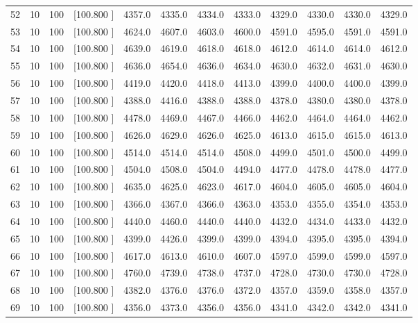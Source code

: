 \documentclass[12pt,a4paper]{article}
\begin{document}
\begin{center}
{\begin{tabular}{r r r r r r r r r r r r}
  52& 10&100&[100.800   ]&  4357.0&  4335.0&  4334.0&  4333.0&  4329.0&  4330.0&  4330.0&  4329.0\\[-0.02in]
  53& 10&100&[100.800   ]&  4624.0&  4607.0&  4603.0&  4600.0&  4591.0&  4595.0&  4591.0&  4591.0\\[-0.02in]
  54& 10&100&[100.800   ]&  4639.0&  4619.0&  4618.0&  4618.0&  4612.0&  4614.0&  4614.0&  4612.0\\[-0.02in]
  55& 10&100&[100.800   ]&  4636.0&  4654.0&  4636.0&  4634.0&  4630.0&  4632.0&  4631.0&  4630.0\\[-0.02in]
  56& 10&100&[100.800   ]&  4419.0&  4420.0&  4418.0&  4413.0&  4399.0&  4400.0&  4400.0&  4399.0\\[-0.02in]
  57& 10&100&[100.800   ]&  4388.0&  4416.0&  4388.0&  4388.0&  4378.0&  4380.0&  4380.0&  4378.0\\[-0.02in]
  58& 10&100&[100.800   ]&  4478.0&  4469.0&  4467.0&  4466.0&  4462.0&  4464.0&  4464.0&  4462.0\\[-0.02in]
  59& 10&100&[100.800   ]&  4626.0&  4629.0&  4626.0&  4625.0&  4613.0&  4615.0&  4615.0&  4613.0\\[-0.02in]
  60& 10&100&[100.800   ]&  4514.0&  4514.0&  4514.0&  4508.0&  4499.0&  4501.0&  4500.0&  4499.0\\[-0.02in]
  61& 10&100&[100.800   ]&  4504.0&  4508.0&  4504.0&  4494.0&  4477.0&  4478.0&  4478.0&  4477.0\\[-0.02in]
  62& 10&100&[100.800   ]&  4635.0&  4625.0&  4623.0&  4617.0&  4604.0&  4605.0&  4605.0&  4604.0\\[-0.02in]
  63& 10&100&[100.800   ]&  4366.0&  4367.0&  4366.0&  4363.0&  4353.0&  4355.0&  4354.0&  4353.0\\[-0.02in]
  64& 10&100&[100.800   ]&  4440.0&  4460.0&  4440.0&  4440.0&  4432.0&  4434.0&  4433.0&  4432.0\\[-0.02in]
  65& 10&100&[100.800   ]&  4399.0&  4426.0&  4399.0&  4399.0&  4394.0&  4395.0&  4395.0&  4394.0\\[-0.02in]
  66& 10&100&[100.800   ]&  4617.0&  4613.0&  4610.0&  4607.0&  4597.0&  4599.0&  4599.0&  4597.0\\[-0.02in]
  67& 10&100&[100.800   ]&  4760.0&  4739.0&  4738.0&  4737.0&  4728.0&  4730.0&  4730.0&  4728.0\\[-0.02in]
  68& 10&100&[100.800   ]&  4382.0&  4376.0&  4376.0&  4372.0&  4357.0&  4359.0&  4358.0&  4357.0\\[-0.02in]
  69& 10&100&[100.800   ]&  4356.0&  4373.0&  4356.0&  4356.0&  4341.0&  4342.0&  4342.0&  4341.0\\[-0.02in]

\end{tabular}}
\end{center}
\end{document}

